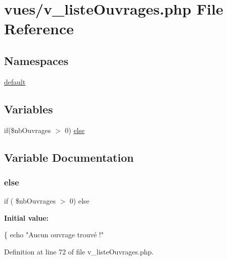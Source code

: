 \hypertarget{v__liste_ouvrages_8php}{}\section{vues/v\+\_\+liste\+Ouvrages.php File Reference}
\label{v__liste_ouvrages_8php}
\subsection*{Namespaces}
\begin{DoxyCompactItemize}
\item 
 \hyperlink{namespacedefault}{default}
\end{DoxyCompactItemize}
\subsection*{Variables}
\begin{DoxyCompactItemize}
\item 
if(\$nb\+Ouvrages $>$ 0) \hyperlink{v__liste_ouvrages_8php_a873f370faaabb3d7c632416b3c1e5a45}{else}
\end{DoxyCompactItemize}


\subsection{Variable Documentation}
\mbox{\label{v__liste_ouvrages_8php_a873f370faaabb3d7c632416b3c1e5a45}} 
\subsubsection{\texorpdfstring{else}{else}}
{\footnotesize\ttfamily if ( \$nb\+Ouvrages $>$ 0) else}

{\bfseries Initial value\+:}
\begin{DoxyCode}
\{           
                    echo \textcolor{stringliteral}{"Aucun ouvrage trouvé !"}
\end{DoxyCode}


Definition at line 72 of file v\+\_\+liste\+Ouvrages.\+php.

